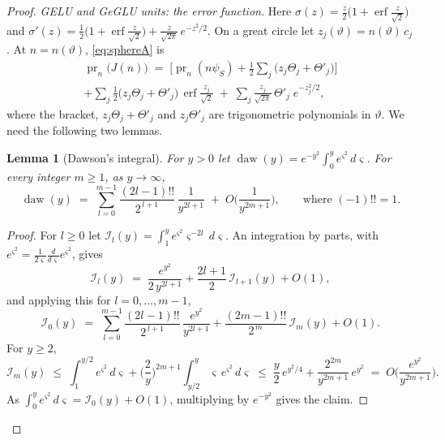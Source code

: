\documentclass[10pt]{article}
\newtheorem{lemma}[theorem]{Lemma}
\theoremstyle{definition}
\theoremstyle{remark}
\newenvironment{nested}{\par\nopagebreak\def\FrameCommand{\hspace{0.5em}{\color{black!30}\vrule width 0.6pt}\hspace{1em}}\MakeFramed{\advance\hsize-\width\FrameRestore}}{\endMakeFramed}
\begin{document}
\begin{proof}
\emph{GELU and GeGLU units: the error function.} Here $\sigma(z) = \tfrac{z}{2}\big(1 + \operatorname{erf}\tfrac{z}{\sqrt2}\big)$ and $\sigma'(z) = \tfrac12\big(1 + \operatorname{erf}\tfrac{z}{\sqrt2}\big) + \tfrac{z}{\sqrt{2\pi}}\,e^{-z^2/2}$. On a great circle let $z_j(\vartheta) = n(\vartheta)\,c_j$. At $n = n(\vartheta)$, \eqref{eq:sphereA} is
\begin{multline}\label{eq:sphereerf}
\operatorname{pr}_n\big(J(n)\big) \;=\; \Big[\operatorname{pr}_n(n\psi_S) + \tfrac12\sum_j\big(z_j\Theta_j + \Theta'_j\big)\Big] \\ + \sum_j \tfrac12\big(z_j\Theta_j + \Theta'_j\big)\,\operatorname{erf}\frac{z_j}{\sqrt2} \;+\; \sum_j \frac{z_j}{\sqrt{2\pi}}\,\Theta'_j\;e^{-z_j^2/2},
\end{multline}
where the bracket, $z_j\Theta_j + \Theta'_j$ and $z_j\Theta'_j$ are trigonometric polynomials in $\vartheta$. We need the following two lemmas.
\begin{nested}
\begin{lemma}[Dawson's integral]\label{lem:dawson}
For $y > 0$ let $\operatorname{daw}(y) = e^{-y^2}\int_0^y e^{\varsigma^2}\,d\varsigma$. For every integer $m \ge 1$, as $y \to \infty$,
\[
\operatorname{daw}(y) \;=\; \sum_{l=0}^{m-1}\frac{(2l-1)!!}{2^{\,l+1}}\,\frac{1}{y^{2l+1}} \;+\; O\Big(\frac{1}{y^{2m+1}}\Big), \qquad\text{where } (-1)!! = 1 .
\]
\end{lemma}

\begin{proof}
For $l \ge 0$ let $\mathcal I_l(y) = \int_1^y e^{\varsigma^2}\varsigma^{-2l}\,d\varsigma$. An integration by parts, with $e^{\varsigma^2} = \tfrac{1}{2\varsigma}\tfrac{d}{d\varsigma}e^{\varsigma^2}$, gives
\[
\mathcal I_l(y) \;=\; \frac{e^{y^2}}{2\,y^{2l+1}} + \frac{2l+1}{2}\,\mathcal I_{l+1}(y) + O(1),
\]
and applying this for $l = 0, \dots, m-1$,
\[
\mathcal I_0(y) \;=\; \sum_{l=0}^{m-1}\frac{(2l-1)!!}{2^{\,l+1}}\,\frac{e^{y^2}}{y^{2l+1}} + \frac{(2m-1)!!}{2^{\,m}}\,\mathcal I_m(y) + O(1).
\]
For $y \ge 2$,
\[
\mathcal I_m(y) \;\le\; \int_1^{y/2} e^{\varsigma^2}\,d\varsigma + \Big(\frac{2}{y}\Big)^{2m+1}\int_{y/2}^{y}\varsigma\,e^{\varsigma^2}\,d\varsigma \;\le\; \frac{y}{2}\,e^{y^2/4} + \frac{2^{2m}}{y^{2m+1}}\,e^{y^2} \;=\; O\Big(\frac{e^{y^2}}{y^{2m+1}}\Big).
\]
As $\int_0^y e^{\varsigma^2}\,d\varsigma = \mathcal I_0(y) + O(1)$, multiplying by $e^{-y^2}$ gives the claim.
\end{proof}


\end{nested}
\end{proof}
\end{document}
